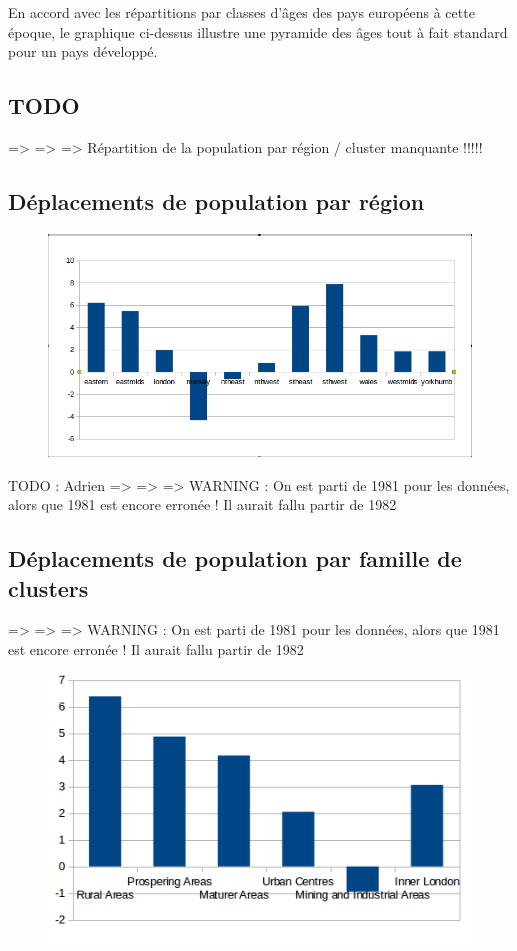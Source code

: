 En accord avec les répartitions par classes d'âges des pays européens à cette époque, le graphique ci-dessus illustre une pyramide des âges tout à fait standard pour un pays développé.
\pagebreak


\subsection{TODO}
=> => => Répartition de la population par région / cluster manquante !!!!!
\pagebreak


\subsection{Déplacements de population par région}
\begin{figure}[h!]
    \centering
    \includegraphics[width=\linewidth]{images/pop/deltaPopRegions.png}
\end{figure}
TODO : Adrien
=> => => WARNING : On est parti de 1981 pour les données, alors que 1981 est encore erronée ! Il aurait fallu partir de 1982
\pagebreak


\subsection{Déplacements de population par famille de clusters}
=> => => WARNING : On est parti de 1981 pour les données, alors que 1981 est encore erronée ! Il aurait fallu partir de 1982

\begin{figure}[h!]
    \centering
    \includegraphics[width=\linewidth]{images/pop/deltaPopFamilleCluster.png}
\end{figure}

